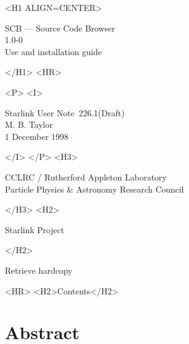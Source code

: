 \documentclass[twoside,11pt]{article}
\newcommand{\stardoccategory}  {Starlink User Note}
\newcommand{\stardocsource}    {sun\stardocnumber}
\newcommand{\stardocnumber}    {226.1(Draft)}
\newcommand{\stardocauthors}   {M. B. Taylor}
\newcommand{\stardocdate}      {1 December 1998}
\newcommand{\stardoctitle}     {SCB --- Source Code Browser}
\newcommand{\stardocversion}   {1.0-0}
\newcommand{\stardocmanual}    {Use and installation guide}
\newcommand{\htmladdnormallink}[2]{#1}
\newcommand{\htmladdimg}[1]{}
\newcommand{\htmlref}[2]{#1}
\newcommand{\htmladdtonavigation}[1]{}
\newcommand{\xlabel}[1]{}
\renewcommand{\_}{\texttt{\symbol{95}}}
\begin{document}
\begin{htmlonly}
   \xlabel{}
   \begin{rawhtml} <H1 ALIGN=CENTER> \end{rawhtml}
      \stardoctitle\\
      \stardocversion\\
      \stardocmanual
   \begin{rawhtml} </H1> <HR> \end{rawhtml}


   \begin{rawhtml} <P> <I> \end{rawhtml}
   \stardoccategory\ \stardocnumber \\
   \stardocauthors \\
   \stardocdate
   \begin{rawhtml} </I> </P> <H3> \end{rawhtml}
      \htmladdnormallink{CCLRC}{http://www.cclrc.ac.uk} /
      \htmladdnormallink{Rutherford Appleton Laboratory}
                        {http://www.cclrc.ac.uk/ral} \\
      \htmladdnormallink{Particle Physics \& Astronomy Research Council}
                        {http://www.pparc.ac.uk} \\
   \begin{rawhtml} </H3> <H2> \end{rawhtml}
      \htmladdnormallink{Starlink Project}{http://star-www.rl.ac.uk/}
   \begin{rawhtml} </H2> \end{rawhtml}
   \htmladdnormallink{\htmladdimg{source.gif} Retrieve hardcopy}
      {http://star-www.rl.ac.uk/cgi-bin/hcserver?\stardocsource}\\

  \label{stardoccontents}
  \begin{rawhtml} 
    <HR>
    <H2>Contents</H2>
  \end{rawhtml}
  \htmladdtonavigation{\htmlref{\htmladdimg{contents_motif.gif}}
        {stardoccontents}}

  \section{\xlabel{abstract}Abstract}
\end{htmlonly}
\end{document}
